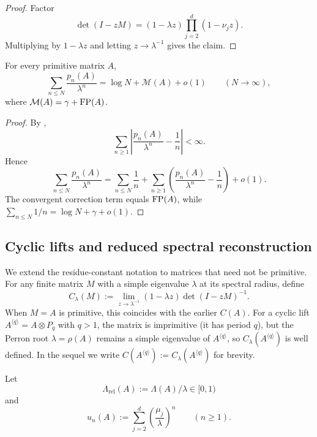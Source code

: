 \begin{proof}
  Factor
  \[
    \det(I-zM)
    =(1-\lambda z)\prod_{j=2}^d(1-\nu_j z).
  \]
  Multiplying by \(1-\lambda z\) and letting \(z\to\lambda^{-1}\) gives
  the claim.
\end{proof}

\begin{corollary}
  \label{cor:finite-part-mertens-asymptotic}
  For every primitive matrix \(A\),
  \[
    \sum_{n\le N}\frac{p_n(A)}{\lambda^n}
    =\log N+\mathcal M(A)+o(1)
    \qquad (N\to\infty),
  \]
  where \(\mathcal M(A)=\gamma+\operatorname{FP}(A)\).
\end{corollary}

\begin{proof}
  By ,
  \[
    \sum_{n\ge 1}\left|\frac{p_n(A)}{\lambda^n}-\frac{1}{n}\right|
    <\infty.
  \]
  Hence
  \[
    \sum_{n\le N}\frac{p_n(A)}{\lambda^n}
    =
    \sum_{n\le N}\frac{1}{n}
    +\sum_{n\ge 1}
      \left(\frac{p_n(A)}{\lambda^n}-\frac{1}{n}\right)
    +o(1).
  \]
  The convergent correction term equals \(\operatorname{FP}(A)\), while
  \(\sum_{n\le N}1/n=\log N+\gamma+o(1)\).
\end{proof}

\subsection{Cyclic lifts and reduced spectral reconstruction}

We extend the residue-constant notation to matrices that need not be
primitive. For any finite matrix \(M\) with a simple
eigenvalue \(\lambda\) at its spectral radius, define
\begin{equation}\label{eq:residue-constant-general}
  C_\lambda(M):=\lim_{z\to\lambda^{-1}}(1-\lambda z)\det(I-zM)^{-1}.
\end{equation}
When \(M=A\) is primitive, this coincides with the earlier
\(C(A)\). For a cyclic lift \(A^{\langle q\rangle}=A\otimes P_q\)
with \(q>1\), the matrix is imprimitive (it has period \(q\)), but
the Perron root \(\lambda=\rho(A)\) remains a simple eigenvalue
of \(A^{\langle q\rangle}\), so \(C_\lambda(A^{\langle q\rangle})\)
is well defined. In the sequel we write
\(C(A^{\langle q\rangle}):=C_\lambda(A^{\langle q\rangle})\) for
brevity.

\medskip
Let
\[
  \Lambda_{\mathrm{rel}}(A):=\Lambda(A)/\lambda\in[0,1)
\]
and
\[
  u_n(A):=\sum_{j=2}^d\left(\frac{\mu_j}{\lambda}\right)^n
  \qquad (n\ge 1).
\]

